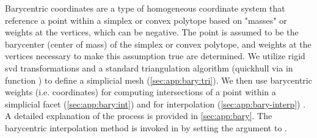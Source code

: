 \documentclass[final,twocolumn,12pt]{elsarticle}
\begin{document}
Barycentric coordinates are a type of homogeneous coordinate system that reference a \outpt{} point within a simplex \cite{langerSphericalBarycentricCoordinates2006} or convex polytope \cite{floaterGeneralizedBarycentricCoordinates2015,meyerGeneralizedBarycentricCoordinates2002,langerSphericalBarycentricCoordinates2006} based on "masses" or weights at the vertices, which can be negative. The \outpt{} point is assumed to be the barycenter (center of mass) of the simplex or convex polytope, and weights at the vertices necessary to make this assumption true are determined. We utilize rigid \gls{svd} transformations and a standard triangulation algorithm (quickhull \cite{barberQuickhullAlgorithmConvex1996} via  in \vfzorepo{} function ) to define a simplicial mesh (\cref{sec:app:bary:tri}). We then use barycentric weights (i.e. coordinates) for computing intersections of a point within a simplicial facet (\cref{sec:app:bary:int}) and for interpolation (\cref{sec:app:bary-interp}) \cite{langerSphericalBarycentricCoordinates2006}. A detailed explanation of the process is provided in \cref{sec:app:bary}. The barycentric interpolation method is invoked in  by setting the  argument to .

\subsubsection{}
\label{sec:methods:interp:gpr}

\end{document}
